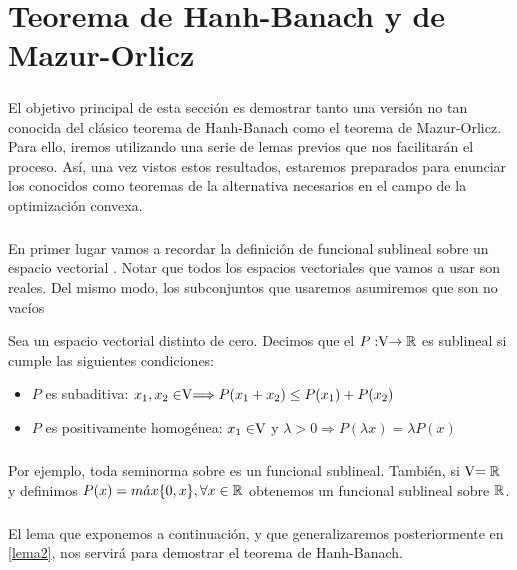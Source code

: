 \chapter*{Teorema de Hanh-Banach y de Mazur-Orlicz}
	\thispagestyle{empty}

	\paragraph{}El objetivo principal de esta sección es demostrar tanto una versión no tan conocida del clásico teorema de Hanh-Banach como el teorema de Mazur-Orlicz. Para ello, iremos utilizando una serie de lemas previos que nos facilitarán el proceso. Así, una vez vistos estos resultados, estaremos preparados para enunciar los conocidos como teoremas de la alternativa necesarios en el campo de la optimización convexa.
	
	\paragraph{} En primer lugar vamos a recordar la definición de funcional sublineal sobre un espacio vectorial \vecSpace . Notar que todos los espacios vectoriales que vamos a usar son reales. Del mismo modo, los subconjuntos que usaremos asumiremos que son no vacíos
	
	\begin{definicion}
		Sea \vecSpace un espacio vectorial distinto de cero. Decimos que el $P:\vecSpace \rightarrow \RR$ es sublineal si cumple las siguientes condiciones:
		\begin{itemize}
			\item $ P $ es subaditiva: $x_1, x_2 \in \vecSpace \Longrightarrow P(x_1 + x_2) \leq P(x_1) + P(x_2) $
			\item $ P $ es positivamente homogénea: $x_1 \in \vecSpace $ y $ \lambda > 0 \Longrightarrow P(\lambda x) = \lambda P(x) $
		\end{itemize}
	\end{definicion}

	\paragraph{}Por ejemplo, toda seminorma sobre \vecSpace es un funcional sublineal. También, si $ \vecSpace = \RR $ y definimos $ P(x) = m\acute{a}x \{0,x\}, \forall x \in \mathbb{R} $ obtenemos un funcional sublineal sobre $\mathbb{R}$.
	
	\paragraph{} El lema que exponemos a continuación, y que generalizaremos posteriormente en \ref{lema2}, nos servirá para demostrar el teorema de Hanh-Banach. 
	
